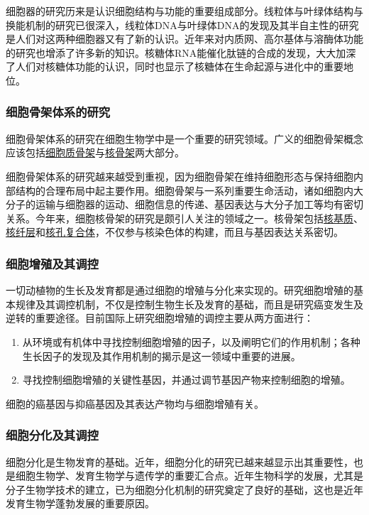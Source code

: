 细胞器的研究历来是认识细胞结构与功能的重要组成部分。线粒体与叶绿体结构与换能机制的研究已很深入，线粒体DNA与叶绿体DNA的发现及其半自主性的研究是人们对这两种细胞器又有了新的认识。近年来对内质网、高尔基体与溶酶体功能的研究也增添了许多新的知识。核糖体RNA能催化肽链的合成的发现，大大加深了人们对核糖体功能的认识，同时也显示了核糖体在生命起源与进化中的重要地位。

\subsubsection{细胞骨架体系的研究}

细胞骨架体系的研究在细胞生物学中是一个重要的研究领域。广义的细胞骨架概念应该包括\underline{细胞质骨架}与\underline{核骨架}两大部分。

细胞骨架体系的研究越来越受到重视，因为细胞骨架在维持细胞形态与保持细胞内部结构的合理布局中起主要作用。细胞骨架与一系列重要生命活动，诸如细胞内大分子的运输与细胞器的运动、细胞信息的传递、基因表达与大分子加工等均有密切关系。今年来，细胞核骨架的研究是颇引人关注的领域之一。核骨架包括\underline{核基质}、\underline{核纤层}和\underline{核孔复合体}，不仅参与核染色体的构建，而且与基因表达关系密切。

\subsubsection{细胞增殖及其调控}

一切动植物的生长及发育都是通过细胞的增殖与分化来实现的。研究细胞增殖的基本规律及其调控机制，不仅是控制生物生长及发育的基础，而且是研究癌变发生及逆转的重要途径。目前国际上研究细胞增殖的调控主要从两方面进行：

\begin{enumerate}
\item 从环境或有机体中寻找控制细胞增殖的因子，以及阐明它们的作用机制；各种生长因子的发现及其作用机制的揭示是这一领域中重要的进展。
\item 寻找控制细胞增殖的关键性基因，并通过调节基因产物来控制细胞的增殖。
\end{enumerate}

细胞的癌基因与抑癌基因及其表达产物均与细胞增殖有关。

\subsubsection{细胞分化及其调控}

细胞分化是生物发育的基础。近年，细胞分化的研究已越来越显示出其重要性，也是细胞生物学、发育生物学与遗传学的重要汇合点。近年生物科学的发展，尤其是分子生物学技术的建立，已为细胞分化机制的研究奠定了良好的基础，这也是近年发育生物学蓬勃发展的重要原因。

